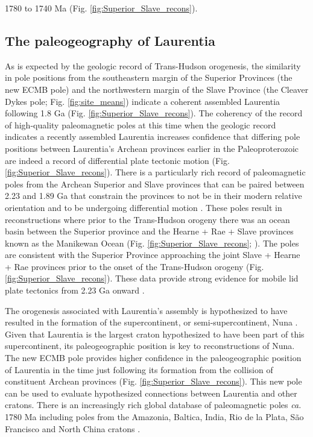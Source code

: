 \documentclass[draft]{agujournal2019}
\begin{document}
1780 to 1740 Ma (Fig. \ref{fig:Superior_Slave_recons}).
 
\subsection{The paleogeography of Laurentia}

As is expected by the geologic record of Trans-Hudson orogenesis, the similarity in pole positions from the southeastern margin of the Superior Provinces (the new ECMB pole) and the northwestern margin of the Slave Province (the Cleaver Dykes pole; Fig. \ref{fig:site_means}) indicate a coherent assembled Laurentia following 1.8 Ga (Fig. \ref{fig:Superior_Slave_recons}). The coherency of the record of high-quality paleomagnetic poles at this time when the geologic record indicates a recently assembled Laurentia increases confidence that differing pole positions between Laurentia's Archean provinces earlier in the Paleoproterozoic are indeed a record of differential plate tectonic motion (Fig. \ref{fig:Superior_Slave_recons}). There is a particularly rich record of paleomagnetic poles from the Archean Superior and Slave provinces that can be paired between 2.23 and 1.89 Ga that constrain the provinces to not be in their modern relative orientation and to be undergoing differential motion \cite{Mitchell2014a, Buchan2016a, Swanson-Hysell2021a}. These poles result in reconstructions where prior to the Trans-Hudson orogeny there was an ocean basin between the Superior province and the Hearne + Rae + Slave provinces known as the Manikewan Ocean (Fig. \ref{fig:Superior_Slave_recons}; ). The poles are consistent with the Superior Province approaching the joint Slave + Hearne + Rae provinces prior to the onset of the Trans-Hudson orogeny (Fig. \ref{fig:Superior_Slave_recons}). These data provide strong evidence for mobile lid plate tectonics from 2.23 Ga onward \cite{Mitchell2014a, Buchan2016a, Swanson-Hysell2021a}.

The orogenesis associated with Laurentia's assembly is hypothesized to have resulted in the formation of the supercontinent, or semi-supercontinent, Nuna \cite{Hoffman1997a, Evans2011a, Evans2016a}. Given that Laurentia is the largest craton hypothesized to have been part of this supercontinent, its paleogeographic position is key to reconstructions of Nuna. The new ECMB pole provides higher confidence in the paleogeographic position of Laurentia in the time just following its formation from the collision of constituent Archean provinces (Fig. \ref{fig:Superior_Slave_recons}). This new pole can be used to evaluate hypothesized connections between Laurentia and other cratons. There is an increasingly rich global database of paleomagnetic poles \textit{ca.} 1780 Ma including poles from the Amazonia, Baltica, India, Rio de la Plata, S\~{a}o Francisco and North China cratons \cite{Zhang2012a, Xu2014a, Bispo-Santos2014a, Shankar2018a, DAgrella-Filho2020a}.
\end{document}

